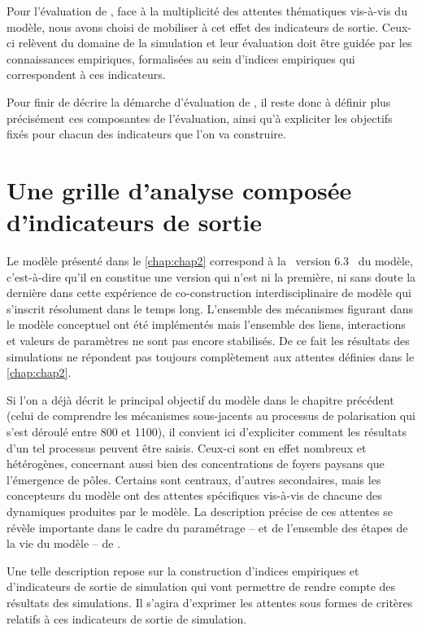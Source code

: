Pour l'évaluation de \simfeodal{}, face à la multiplicité des attentes thématiques vis-à-vis du modèle, nous avons choisi de mobiliser à cet effet des \og indicateurs de sortie\fg{}.
Ceux-ci relèvent du domaine de la simulation et leur évaluation doit être guidée par les connaissances empiriques, formalisées au sein d'\og indices empiriques\fg{} qui correspondent à ces indicateurs.

Pour finir de décrire la démarche d'évaluation de \simfeodal{}, il reste donc à définir plus précisément ces composantes de l'évaluation, ainsi qu'à expliciter les objectifs fixés pour chacun des indicateurs que l'on va construire.

\let\orisectionmark\sectionmark
\renewcommand\sectionmark[1]{}%
\section{Une grille d'analyse composée d'indicateurs de sortie \label{sec:indicateurs-sortie}}
\orisectionmark{Les indicateurs de sortie}
\let\sectionmark\orisectionmark

Le modèle \simfeodal{} présenté dans le \cref{chap:chap2} correspond à la \og version 6.3 \fg{} du modèle, c'est-à-dire qu'il en constitue une version qui n'est ni la première, ni sans doute la dernière dans cette expérience de co-construction interdisciplinaire de modèle qui s'inscrit résolument dans le temps long.
L'ensemble des mécanismes figurant dans le modèle conceptuel ont été implémentés mais l'ensemble des liens, interactions et valeurs de paramètres ne sont pas encore stabilisés.
De ce fait les résultats des simulations ne répondent pas toujours complètement aux attentes définies dans le \cref{chap:chap2}.

Si l'on a déjà décrit le principal objectif du modèle dans le chapitre précédent (celui de comprendre les mécanismes sous-jacents au processus de polarisation qui s'est déroulé entre 800 et 1100), il convient ici d'expliciter comment les résultats d'un tel processus peuvent être saisis.
Ceux-ci sont en effet nombreux et hétérogènes, concernant aussi bien des concentrations de foyers paysans que l'émergence de pôles.
Certains sont centraux, d'autres secondaires, mais les concepteurs du modèle ont des attentes spécifiques vis-à-vis de chacune des dynamiques produites par le modèle.
La description précise de ces attentes se révèle importante dans le cadre du paramétrage -- et de l'ensemble des étapes de la vie du modèle -- de \simfeodal{}.

Une telle description repose sur la construction d'\og{}indices empiriques\fg{} et d'\og{}indicateurs de sortie de simulation\fg{} qui vont permettre de rendre compte des résultats des simulations.
Il s'agira d'exprimer les attentes sous formes de critères relatifs à ces indicateurs de sortie de simulation.


